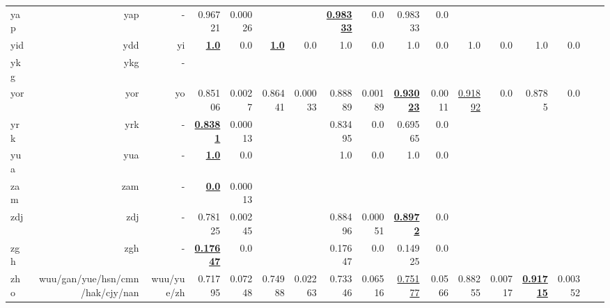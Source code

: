 \documentclass[11pt]{article}
\begin{document}
\begin{table*}[h]
{\begin{tabular}{lrrrrrrrrrrrrrrrr}
yap         & yap         & -         & 0.96721         & 0.00026         &          &          & \textbf{\underline{0.98333}}         & 0.0         & 0.98333         & 0.0         &          &          &          &          \\
yid         & ydd         & yi         & \textbf{\underline{1.0}}         & 0.0         & \textbf{\underline{1.0}}         & 0.0         & 1.0         & 0.0         & 1.0         & 0.0         & 1.0         & 0.0         & 1.0         & 0.0         \\
ykg         & ykg         & -         &          &          &          &          &          &          &          &          &          &          &          &          \\
yor         & yor         & yo         & 0.85106         & 0.0027         & 0.86441         & 0.00033         & 0.88889         & 0.00189         & \textbf{\underline{0.93023}}         & 0.0011         & \underline{0.91892}         & 0.0         & 0.8785         & 0.0         \\
yrk         & yrk         & -         & \textbf{\underline{0.8381}}         & 0.00013         &          &          & 0.83495         & 0.0         & 0.69565         & 0.0         &          &          &          &          \\
yua         & yua         & -         & \textbf{\underline{1.0}}         & 0.0         &          &          & 1.0         & 0.0         & 1.0         & 0.0         &          &          &          &          \\
zam         & zam         & -         & \textbf{\underline{0.0}}         & 0.00013         &          &          &          &          &          &          &          &          &          &          \\
zdj         & zdj         & -         & 0.78125         & 0.00245         &          &          & 0.88496         & 0.00051         & \textbf{\underline{0.8972}}         & 0.0         &          &          &          &          \\
zgh         & zgh         & -         & \textbf{\underline{0.17647}}         & 0.0         &          &          & 0.17647         & 0.0         & 0.14925         & 0.0         &          &          &          &          \\
zho         & wuu/gan/yue/hsn/cmn/hak/cjy/nan         & wuu/yue/zh         & 0.71795         & 0.07248         & 0.74988         & 0.02263         & 0.73346         & 0.06516         & \underline{0.75177}         & 0.0566         & 0.88255         & 0.00717         & \textbf{\underline{0.91715}}         & 0.00352         \\

\end{tabular}}
\end{table*}
\end{document}
